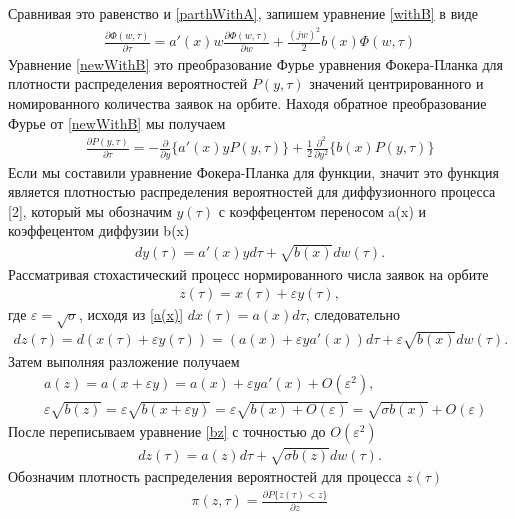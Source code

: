Сравнивая это равенство и \eqref{parthWithA}, запишем уравнение \eqref{withB} в виде
\begin{align}\label{newWithB}
\frac{\partial \Phi (w,\tau)}{\partial \tau}=a'(x) w\frac{\partial \Phi (w,\tau)}{\partial w}+\frac{(jw)^2}{2}b(x)\Phi(w,\tau)
\end{align}
Уравнение \eqref{newWithB} это преобразование Фурье уравнения Фокера-Планка для плотности распределения вероятностей $P(y, \tau )$ значений центрированного и номированного количества заявок на орбите. Находя обратное преобразование Фурье от \eqref{newWithB} мы получаем
\begin{align}
	\frac{\partial P (y,\tau)}{\partial \tau}=-\frac{\partial}{\partial y}\{a'(x)yP(y,\tau)\} 
	+\frac{1}{2}\frac{\partial^2}{\partial y^2}\{b(x)P(y,\tau)\}
\end{align}
Если мы составили уравнение Фокера-Планка для функции, значит это функция является плотностью распределения вероятностей для диффузионного процесса [2], который мы обозначим $y(\tau)$ с коэффецентом переносом a(x) и коэффецентом диффузии b(x) 
\begin{align}
	dy(\tau)=a'(x)yd\tau+\sqrt{b(x)}dw(\tau).
\end{align}
Рассматривая стохастический процесс нормированного числа заявок на орбите
\begin{align}
	z(\tau)=x(\tau)+\varepsilon y(\tau),
\end{align}
где $\varepsilon=\sqrt{\sigma}$, исходя из \eqref{a(x)} $dx(\tau)=a(x)d\tau$, следовательно
\begin{align}\label{bz}
	dz(\tau)=d(x(\tau)+\varepsilon y(\tau))=(a(x)+\varepsilon ya'(x))d\tau+\varepsilon \sqrt{b(x)}dw(\tau).
\end{align}
Затем выполняя разложение получаем 
\begin{align*}
	&a(z)=a(x+\varepsilon y)=a(x)+\varepsilon y a'(x)+O(\varepsilon^2),\\
	&\varepsilon\sqrt{b(z)}=\varepsilon\sqrt{b(x+\varepsilon y)}=\varepsilon\sqrt{b(x)+O(\varepsilon)}=\sqrt{\sigma b(x)}+O(\varepsilon)
\end{align*}
После переписываем уравнение \eqref{bz} с точностью до $O(\varepsilon^2)$
\begin{align}\label{newBz}
	dz(\tau)=a(z)d\tau+\sqrt{\sigma b(z)}dw(\tau).
\end{align}
Обозначим плотность распределения вероятностей для процесса $z(\tau)$
\begin{align*}
	\pi(z,\tau)=\frac{\partial P\{z(\tau)<z\}}{\partial z}
\end{align*}
